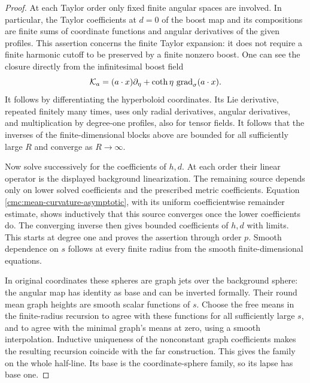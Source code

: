 \begin{proof}
At each Taylor order only fixed finite angular spaces are involved.
In particular, the Taylor coefficients at \(d=0\) of the boost map
and its compositions are finite sums of coordinate functions and
angular derivatives of the given profiles.  This assertion concerns
the finite Taylor expansion: it does not require a finite harmonic
cutoff to be preserved by a finite nonzero boost.
One can see the closure directly from the infinitesimal boost field
\[
 \mathcal K_a=(a\cdot x)\partial_\eta
               +\coth\eta\,\operatorname{grad}_\sigma(a\cdot x).
\]
It follows by differentiating the hyperboloid coordinates.
Its Lie derivative, repeated finitely many times, uses only radial
derivatives, angular derivatives, and multiplication by degree-one
profiles, also for tensor fields.
It follows that the inverses of the finite-dimensional blocks above
are bounded for all sufficiently large \(R\) and converge as
\(R\to\infty\).

Now solve successively for the coefficients of \(h,d\).
At each order their linear operator is the displayed background
linearization.  The remaining source depends only on lower solved
coefficients and the prescribed metric coefficients.
Equation \eqref{cmc:mean-curvature-asymptotic}, with its uniform
coefficientwise remainder estimate, shows inductively that this
source converges once the lower coefficients do.
The converging inverse then gives bounded coefficients of \(h,d\)
with limits.  This starts at degree one and proves the assertion
through order \(p\).
Smooth dependence on \(s\) follows at every finite radius from the
smooth finite-dimensional equations.

In original coordinates these spheres are graph jets over the
background sphere: the angular map has identity as base and can be
inverted formally.  Their round mean graph heights are smooth scalar
functions of \(s\).  Choose the free means in the finite-radius
recursion to agree with these functions for all sufficiently large
\(s\), and to agree with the minimal graph's means at zero, using a
smooth interpolation.  Inductive uniqueness of the nonconstant
graph coefficients makes the resulting recursion coincide with the
far construction.  This gives the family on the whole half-line.
Its base is the coordinate-sphere family, so its lapse has base one.


\end{proof}
